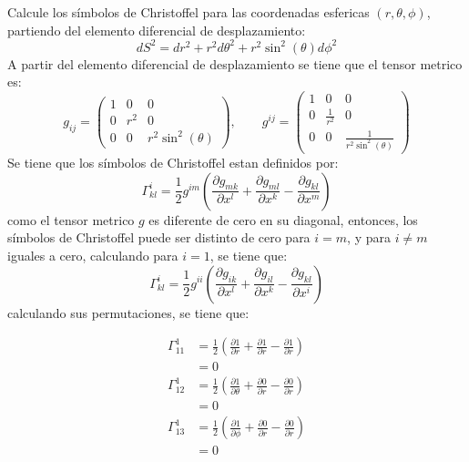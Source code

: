 \documentclass[12pt,letterpaper]{report}
\begin{document}
Calcule los símbolos de Christoffel para las coordenadas esfericas $(r,\theta,\phi)$, partiendo del elemento diferencial de desplazamiento:
\begin{equation*}
    dS^2=dr^2+r^2d\theta^2 +r^2\sin^2(\theta)d\phi^2
\end{equation*}
A partir del elemento diferencial de desplazamiento se tiene que el tensor metrico es:
\begin{equation*}
    g_{ij} = \left(\begin{matrix}
        1 & 0 & 0 \\
        0 & r^2 & 0 \\ 
        0 & 0 & r^2\sin^2(\theta)
    \end{matrix}\right), \qquad
    g^{ij} = \left(\begin{matrix}
        1 & 0 & 0 \\
        0 & \frac{1}{r^2} & 0 \\ 
        0 & 0 & \frac{1}{r^2\sin^2(\theta)}
    \end{matrix}\right)
\end{equation*}
Se tiene que los símbolos de Christoffel estan definidos por:
\begin{equation*}
    \Gamma^{i}_{kl} = \frac{1}{2}g^{im} \left(\frac{\partial g_{mk}}{\partial x^l}+\frac{\partial g_{ml}}{\partial x^k}-\frac{\partial g_{kl}}{\partial x^m} \right)
\end{equation*}
como el tensor metrico $g$ es diferente de cero en su diagonal, entonces, los símbolos de Christoffel puede ser distinto de cero para $i=m$, y para $i\neq m$ iguales a cero, calculando para $i=1$, se tiene que:
\begin{equation*}
    \Gamma^{i}_{kl}= \frac{1}{2} g^{ii}\left(\frac{\partial g_{ik}}{\partial x^l}+\frac{\partial g_{il}}{\partial x^k}-\frac{\partial g_{kl}}{\partial x^i} \right)
\end{equation*}
calculando sus permutaciones, se tiene que:\\
\begin{minipage}{0.3\linewidth}
    \begin{align*}
        \Gamma^{1}_{11} &= \frac{1}{2} \left(\frac{\partial 1}{\partial r}+ \frac{\partial 1}{\partial r} - \frac{\partial 1}{\partial r}\right)\\
        &=0\\
        \Gamma^{1}_{12} &= \frac{1}{2} \left(\frac{\partial 1}{\partial \theta}+\frac{\partial 0}{\partial r}-\frac{\partial 0}{\partial r} \right)\\
        &=0\\
        \Gamma^{1}_{13} &= \frac{1}{2} \left(\frac{\partial 1}{\partial \phi}+\frac{\partial 0}{\partial r}-\frac{\partial 0}{\partial r} \right)\\
        &=0\\
    \end{align*}
\end{minipage}
\end{document}
